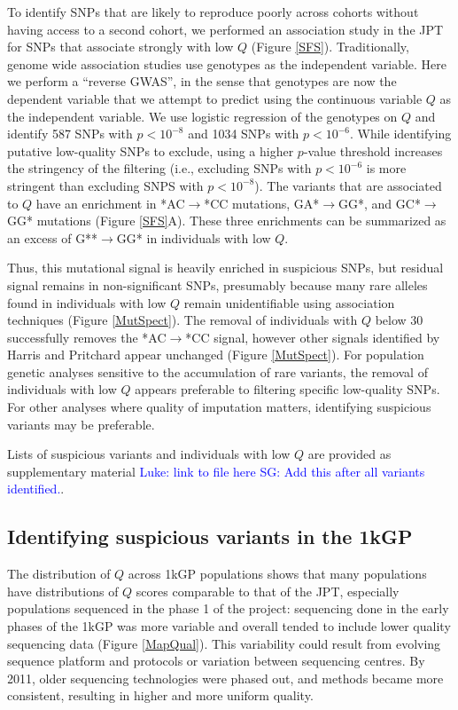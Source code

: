 \documentclass[9pt,lineno]{elife}
\newcommand{\sgcomment}[1]{\textcolor{blue}{SG: #1}}
\newcommand{\luke}[1]{\textcolor{blue}{Luke: #1}}
\begin{document}
To identify SNPs that are likely to reproduce poorly across cohorts without having access to a second cohort, we performed an association study in the JPT for SNPs that associate strongly with low $Q$ (Figure \ref{SFS}).
Traditionally, genome wide association studies use genotypes as the independent variable. 
Here we perform a ``reverse GWAS'', in the sense that genotypes are now the dependent variable that we attempt to predict using the continuous variable $Q$ as the independent variable.
We use logistic regression of the genotypes on $Q$ and identify 587 SNPs with $p < 10^{-8}$ and 1034 SNPs with $ p < 10^{-6}$. 
While identifying putative low-quality SNPs to exclude, using a higher $p$-value threshold increases the stringency of the filtering (i.e., excluding SNPs with $ p < 10^{-6}$ is more stringent than excluding SNPS with $p < 10^{-8}$). 
The variants that are associated to $Q$ have an enrichment in *AC${\rightarrow}$*CC mutations, GA*${\rightarrow}$GG*, and GC*${\rightarrow}$GG* mutations (Figure \ref{SFS}A).
These three enrichments can be summarized as an excess of G**${\rightarrow}$GG* in individuals with low $Q$.

Thus, this mutational signal is heavily enriched in suspicious SNPs, but residual signal remains in non-significant SNPs, presumably because many rare alleles found in individuals with low $Q$ remain unidentifiable using association techniques (Figure \ref{MutSpect}). The removal of individuals with $Q$ below 30 successfully removes the *AC${\rightarrow}$*CC signal, however other signals identified by Harris and Pritchard appear unchanged (Figure \ref{MutSpect}).
For population genetic analyses sensitive to the accumulation of rare variants, the removal of individuals with low $Q$ appears preferable to filtering specific low-quality SNPs. 
For other analyses where quality of imputation matters, identifying suspicious variants may be preferable. 


Lists of suspicious variants and individuals with low $Q$ are provided as supplementary material \luke{link to file here} \sgcomment{Add this after all variants identified.}.

\subsection{Identifying suspicious variants in the 1kGP}
The distribution of $Q$ across 1kGP populations shows that many populations have distributions of $Q$ scores comparable to that of the JPT, especially populations sequenced in the phase 1 of the project: sequencing done in the early phases of the 1kGP was more variable and overall tended to include lower quality sequencing data (Figure \ref{MapQual}).
This variability could result from evolving sequence platform and protocols or variation between sequencing centres. 
By 2011, older sequencing technologies were phased out, and methods became more consistent, resulting in higher and more uniform quality.
\end{document}
